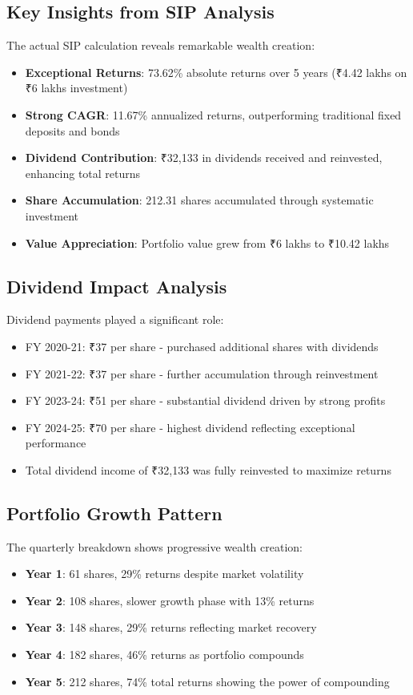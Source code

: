 \documentclass[8pt,a4paper]{article}
\begin{document}
\subsection{Key Insights from SIP Analysis}

The actual SIP calculation reveals remarkable wealth creation:
\begin{itemize}
    \item \textbf{Exceptional Returns}: 73.62\% absolute returns over 5 years (₹4.42 lakhs on ₹6 lakhs investment)
    \item \textbf{Strong CAGR}: 11.67\% annualized returns, outperforming traditional fixed deposits and bonds
    \item \textbf{Dividend Contribution}: ₹32,133 in dividends received and reinvested, enhancing total returns
    \item \textbf{Share Accumulation}: 212.31 shares accumulated through systematic investment
    \item \textbf{Value Appreciation}: Portfolio value grew from ₹6 lakhs to ₹10.42 lakhs
\end{itemize}

\subsection{Dividend Impact Analysis}

Dividend payments played a significant role:
\begin{itemize}
    \item FY 2020-21: ₹37 per share - purchased additional shares with dividends
    \item FY 2021-22: ₹37 per share - further accumulation through reinvestment
    \item FY 2023-24: ₹51 per share - substantial dividend driven by strong profits
    \item FY 2024-25: ₹70 per share - highest dividend reflecting exceptional performance
    \item Total dividend income of ₹32,133 was fully reinvested to maximize returns
\end{itemize}

\subsection{Portfolio Growth Pattern}

The quarterly breakdown shows progressive wealth creation:
\begin{itemize}
    \item \textbf{Year 1}: 61 shares, 29\% returns despite market volatility
    \item \textbf{Year 2}: 108 shares, slower growth phase with 13\% returns
    \item \textbf{Year 3}: 148 shares, 29\% returns reflecting market recovery
    \item \textbf{Year 4}: 182 shares, 46\% returns as portfolio compounds
    \item \textbf{Year 5}: 212 shares, 74\% total returns showing the power of compounding
\end{itemize}
\end{document}
